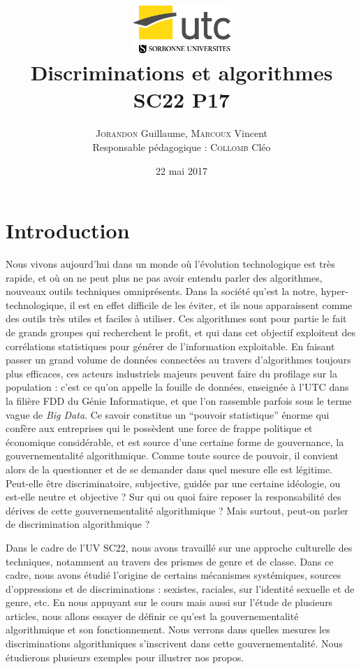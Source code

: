 \documentclass[a4paper,12pt]{report}
\author{\textsc{Jorandon} Guillaume, \textsc{Marcoux} Vincent\\\small{Responsable pédagogique : \textsc{Collomb} Cléo}}
\date{22 mai 2017}
\title{\includegraphics[width=140px]{utc.jpg}\\\vspace{25mm}Discriminations et algorithmes\\\normalsize{SC22 P17}}
\begin{document}
\hypersetup{pageanchor=false}
\maketitle
\tableofcontents
\hypersetup{pageanchor=true}
\chapter*{Introduction}
Nous vivons aujourd'hui dans un monde où l'évolution technologique est très rapide, et où on ne peut plus ne pas avoir entendu parler des algorithmes, nouveaux outils techniques omniprésents. Dans la société qu'est la notre, hyper-technologique, il est en effet difficile de les éviter, et ils nous apparaissent comme des outils très utiles et faciles à utiliser. Ces algorithmes sont pour partie le fait de grands groupes qui recherchent le profit, et qui dans cet objectif exploitent des corrélations statistiques pour générer de l'information exploitable. En faisant passer un grand volume de données connectées au travers d'algorithmes toujours plus efficaces, ces acteurs industriels majeurs peuvent faire du profilage sur la population : c'est ce qu'on appelle la fouille de données, enseignée à l'UTC dans la filière FDD du Génie Informatique, et que l'on rassemble parfois sous le terme vague de \textit{Big Data}. Ce savoir constitue un ``pouvoir statistique'' énorme qui confère aux entreprises qui le possèdent une force de frappe politique et économique considérable, et est source d'une certaine forme de gouvernance, la gouvernementalité algorithmique. Comme toute source de pouvoir, il convient alors de la questionner et de se demander dans quel mesure elle est légitime. Peut-elle être discriminatoire, subjective, guidée par une certaine idéologie, ou est-elle neutre et objective ? Sur qui ou quoi faire reposer la responsabilité des dérives de cette gouvernementalité algorithmique ? Mais surtout, peut-on parler de discrimination algorithmique ? 

Dans le cadre de l'UV SC22, nous avons travaillé sur une approche culturelle des techniques, notamment au travers des prismes de genre et de classe. Dans ce cadre, nous avons étudié l'origine de certains mécanismes systémiques, sources d'oppressions et de discriminations : sexistes, raciales, sur l'identité sexuelle et de genre, etc. En nous appuyant sur le cours mais aussi sur l'étude de plusieurs articles, nous allons essayer de définir ce qu'est la gouvernementalité algorithmique et son fonctionnement. Nous verrons dans quelles mesures les discriminations algorithmiques s'inscrivent dans cette gouvernementalité. Nous étudierons plusieurs exemples pour illustrer nos propos.
\end{document}
